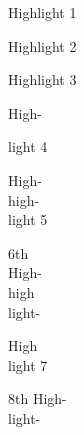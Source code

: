 \documentclass[12pt]{article}
\begin{document}
\newpage
Highlight 1 \par

\newpage
Highlight 2 \par

\newpage
Highlight 3 \par

\newpage
High- \par

\newpage
light 4 \par

\newpage
High- \\
high- \\
light 5 \par

\newpage
6th \\
High- \\
high \\
light- \par

\newpage
High \\
light 7 \par

\newpage
8th High- \\
light- \par
\end{document}
